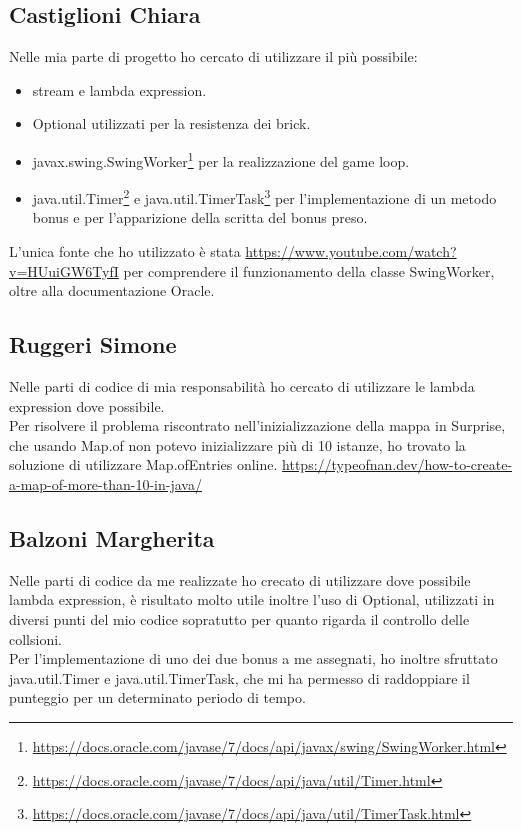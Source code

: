\documentclass[a4paper,12pt]{report}
\begin{document}
\subsection{Castiglioni Chiara}
Nelle mia parte di progetto ho cercato di utilizzare il più possibile:
\begin{itemize}
    \item stream e lambda expression.
    \item Optional utilizzati per la resistenza dei brick.
    \item javax.swing.SwingWorker\footnote{\url{https://docs.oracle.com/javase/7/docs/api/javax/swing/SwingWorker.html}} per la realizzazione del game loop.
    \item java.util.Timer\footnote{\url{https://docs.oracle.com/javase/7/docs/api/java/util/Timer.html}} e java.util.TimerTask\footnote{\url{https://docs.oracle.com/javase/7/docs/api/java/util/TimerTask.html}} per l'implementazione di un metodo bonus e per l'apparizione della scritta del bonus preso.
\end{itemize}

L'unica fonte che ho utilizzato è stata {\url{https://www.youtube.com/watch?v=HUuiGW6TyfI}} per comprendere il funzionamento della
classe SwingWorker, oltre alla documentazione Oracle.
\subsection{Ruggeri Simone}
Nelle parti di codice di mia responsabilità ho cercato di utilizzare le lambda expression dove possibile.\\
Per risolvere il problema riscontrato nell'inizializzazione della mappa in Surprise, che usando Map.of non potevo inizializzare più di
10 istanze, ho trovato la soluzione di utilizzare Map.ofEntries online. {\url{https://typeofnan.dev/how-to-create-a-map-of-more-than-10-in-java/}}
\subsection{Balzoni Margherita}
Nelle parti di codice da me realizzate ho crecato di utilizzare dove possibile lambda expression, è risultato molto utile inoltre l'uso di Optional, utilizzati in diversi punti del mio codice sopratutto per quanto rigarda il controllo delle collsioni.
\\Per l'implementazione di uno dei due bonus a me assegnati, ho inoltre sfruttato java.util.Timer e java.util.TimerTask, che mi ha permesso di raddoppiare il punteggio per un determinato periodo di tempo.
\end{document}
